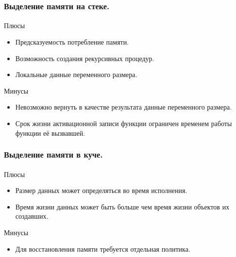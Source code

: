 \documentclass[ucs]{beamer}
\begin{document}

\begin{frame}[fragile]
  \frametitle{Выделение памяти на стеке.}
  \framesubtitle{}
  \begin{block}{Плюсы}
    \begin{itemize}
    \item Предсказуемость потребление памяти.
    \item Возможность создания рекурсивных процедур.
    \item Локальные данные переменного размера.
    \end{itemize}
  \end{block}

  \begin{block}{Минусы}
    \begin{itemize}
    \item Невозможно вернуть в качестве результата данные переменного размера.
    \item Срок жизни активационной записи функции ограничен временем работы
      функции её вызвавшей.
    \end{itemize}
  \end{block}
\end{frame}

\begin{frame}[fragile]
  \frametitle{Выделение памяти в куче.}
  \framesubtitle{}
  \begin{block}{Плюсы}
    \begin{itemize}
    \item Размер данных может определяться во время исполнения.
    \item Время жизни данных может быть больше чем время жизни объектов их
      создавших.
    \end{itemize}
  \end{block}

  \begin{block}{Минусы}
    \begin{itemize}
    \item Для восстановления памяти требуется отдельная политика.
    \end{itemize}
  \end{block}
\end{frame}

\end{document}
